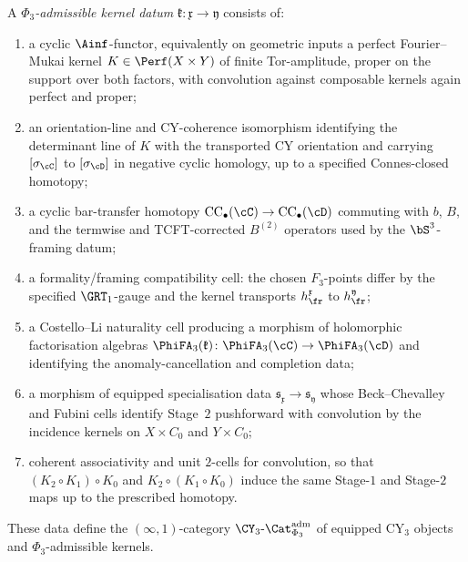 \begin{definition}
A \emph{$\Phi_3$-admissible kernel datum}
$\mathfrak k\colon\mathfrak x\to\mathfrak y$ consists of:
\begin{enumerate}[label=\textup{(K\arabic*)}]
 \item a cyclic $\Ainf$-functor, equivalently on geometric inputs a
 perfect Fourier--Mukai kernel
 $K\in\Perf(X\times Y)$ of finite Tor-amplitude, proper on the support
 over both factors, with convolution against composable kernels again
 perfect and proper;
 \item an orientation-line and CY-coherence isomorphism identifying the
 determinant line of $K$ with the transported CY orientation and carrying
 $[\sigma_\cC]$ to $[\sigma_\cD]$ in negative cyclic homology, up to a
 specified Connes-closed homotopy;
 \item a cyclic bar-transfer homotopy
 $\mathrm{CC}_\bullet(\cC)\to \mathrm{CC}_\bullet(\cD)$ commuting with
 $b$, $B$, and the termwise and TCFT-corrected $B^{(2)}$ operators used
 by the $\bS^3$-framing datum;
 \item a formality/framing compatibility cell: the chosen $F_3$-points
 differ by the specified $\GRT_1$-gauge and the kernel transports
 $h_{\fr}^{\mathfrak x}$ to $h_{\fr}^{\mathfrak y}$;
 \item a Costello--Li naturality cell producing a morphism of
 holomorphic factorisation algebras
 $\PhiFA_3(\mathfrak k)\colon \PhiFA_3(\cC)\to\PhiFA_3(\cD)$ and
 identifying the anomaly-cancellation and completion data;
 \item a morphism of equipped specialisation data
 $\mathfrak s_{\mathfrak x}\to\mathfrak s_{\mathfrak y}$ whose
 Beck--Chevalley and Fubini cells identify Stage~$2$ pushforward with
 convolution by the incidence kernels on $X\times C_0$ and $Y\times C_0$;
 \item coherent associativity and unit $2$-cells for convolution, so
 that $(K_2\circ K_1)\circ K_0$ and $K_2\circ(K_1\circ K_0)$ induce the
 same Stage-$1$ and Stage-$2$ maps up to the prescribed homotopy.
\end{enumerate}
These data define the $(\infty,1)$-category
$\CY_3\text{-}\Cat_{\Phi_3}^{\mathrm{adm}}$ of equipped CY$_3$
objects and $\Phi_3$-admissible kernels.
\end{definition}

